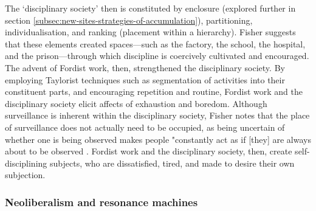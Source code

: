 The `disciplinary society' then is constituted by enclosure (explored further in section \ref{subsec:new-sites-strategies-of-accumulation}), partitioning, individualisation, and ranking (placement within a hierarchy). Fisher suggests that these elements created spaces—such as the factory, the school, the hospital, and the prison—through which discipline is coercively cultivated and encouraged. The advent of Fordist work, then, strengthened the disciplinary society. By employing Taylorist techniques such as segmentation of activities into their constituent parts, and encouraging repetition and routine, Fordist work and the disciplinary society elicit affects of exhaustion and boredom. Although surveillance is inherent within the disciplinary society, Fisher notes that the place of surveillance does not actually need to be occupied, as being uncertain of whether one is being observed makes people "constantly act as if [they] are always about to be observed \citeyearpar[p. 56]{fisher_capitalist_2009}. Fordist work and the disciplinary society, then, create self-disciplining subjects, who are dissatisfied, tired, and made to desire their own subjection.


\subsubsection{Neoliberalism and resonance machines}
\label{neoliberalism-and-resonance-machines}

